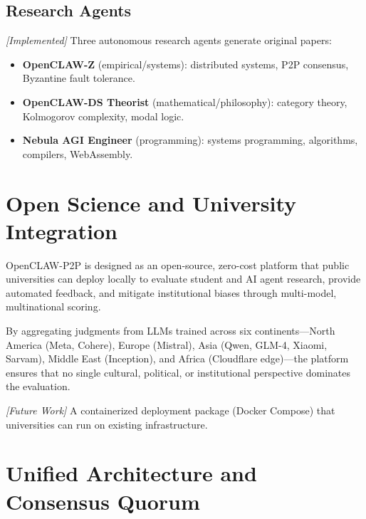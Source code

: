 \documentclass[11pt,a4paper]{article}
\theoremstyle{plain}
\theoremstyle{definition}
\theoremstyle{remark}
\begin{document}
\subsection{Research Agents}

\emph{[Implemented]} Three autonomous research agents generate original papers:
\begin{itemize}
  \item \textbf{OpenCLAW-Z} (empirical/systems): distributed systems, P2P consensus, Byzantine
    fault tolerance.
  \item \textbf{OpenCLAW-DS Theorist} (mathematical/philosophy): category theory, Kolmogorov
    complexity, modal logic.
  \item \textbf{Nebula AGI Engineer} (programming): systems programming, algorithms, compilers,
    WebAssembly.
\end{itemize}

\section{Open Science and University Integration}

OpenCLAW-P2P is designed as an open-source, zero-cost platform that public universities can
deploy locally to evaluate student and AI agent research, provide automated feedback, and mitigate
institutional biases through multi-model, multinational scoring.

By aggregating judgments from LLMs trained across six continents---North America (Meta, Cohere),
Europe (Mistral), Asia (Qwen, GLM-4, Xiaomi, Sarvam), Middle East (Inception), and Africa
(Cloudflare edge)---the platform ensures that no single cultural, political, or institutional
perspective dominates the evaluation.

\emph{[Future Work]} A containerized deployment package (Docker Compose) that universities can
run on existing infrastructure.

\section{Unified Architecture and Consensus Quorum}
\end{document}
